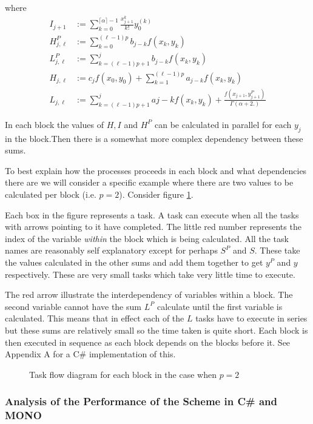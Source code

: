 where
\begin{align}
I_{j+1} & := \sum_{k=0}^{\lceil \alpha \rceil -1} \frac{x_{j+1}^k}{k!} y_0^{(k)} \\
H^P_{j,\ell} & := \sum_{k=0}^{(\ell-1)p} b_{j-k} f(x_k, y_k) \\
L_{j,\ell}^P & := \sum_{k=(\ell-1)p+1}^{j} b_{j-k} f(x_k,y_k) \\
H_{j,\ell} & := c_j f(x_0, y_0) + \sum_{k=1}^{(\ell - 1)p} a_{j-k}f(x_k, y_k) \\
L_{j,\ell} & := \sum_{k=(\ell-1)p + 1}^j a{j-k} f(x_k, y_k) + \frac{f(x_{j+1}, y^P_{j+1})}{\Gamma(\alpha + 2.)}
\end{align}

In each block the values of $ H, I $ and $ H^P $ can be calculated in parallel for each $ y_j $ in the block.Then there is a somewhat more complex dependency between these sums. 

To best explain how the processes proceeds in each block and what dependencies there are we will consider a specific example where there are two values to be calculated per block (i.e. $ p = 2 $). Consider figure \ref{fig:AMB_Task_Flow}. 

Each box in the figure represents a task. A task can execute when all the tasks with arrows pointing to it have completed. The little red number represents the index of the variable \emph{within} the block which is being calculated. All the task names are reasonably self explanatory except for perhaps $ S^P $ and $ S $. These take the values calculated in the other sums and add them together to get $ y^P $ and $ y $ respectively. These are very small tasks which take very little time to execute.

The red arrow illustrate the interdependency of variables within a block. The second variable cannot have the sum $ L^P $ calculate until the first variable is calculated. This means that in effect each of the $ L $ tasks have to execute in series but these sums are relatively small so the time taken is quite short. Each block is then executed in sequence as each block depends on the blocks before it. See Appendix A for a C\# implementation of this. 

\begin{figure}[H]

\caption{Task flow diagram for each block in the case when $ p = 2 $}
\label{fig:AMB_Task_Flow}
\end{figure}

\subsubsection{Analysis of the Performance of the Scheme in C\# and MONO}

